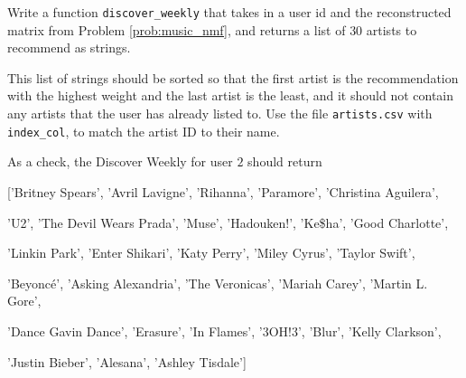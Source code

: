 \begin{problem}
Write a function \texttt{discover\_weekly} that takes in a user id and the reconstructed matrix from Problem \ref{prob:music_nmf}, and returns a list of $30$ artists to recommend as strings.

This list of strings should be sorted so that the first artist is the recommendation with the highest weight and the last artist is the least, and it should not contain any artists that the user has already listed to.
Use the file \texttt{artists.csv} with \texttt{index\_col}, to match the artist ID to their name.

\noindent As a check, the Discover Weekly for user $2$ should return 

['Britney Spears', 'Avril Lavigne', 'Rihanna', 'Paramore', 'Christina Aguilera', 

'U2', 'The Devil Wears Prada', 'Muse', 'Hadouken!', 'Ke\$ha', 'Good Charlotte', 

'Linkin Park', 'Enter Shikari', 'Katy Perry', 'Miley Cyrus', 'Taylor Swift', 

'Beyoncé', 'Asking Alexandria', 'The Veronicas', 'Mariah Carey', 'Martin L. Gore', 

'Dance Gavin Dance', 'Erasure', 'In Flames', '3OH!3', 'Blur', 'Kelly Clarkson', 

'Justin Bieber', 'Alesana', 'Ashley Tisdale']



       

      
       
       
      

\end{problem}